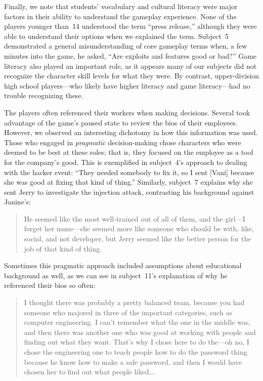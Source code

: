 \documentclass[letterpaper]{article}
\begin{document}
Finally, we note that students' vocabulary and cultural literacy
were major factors in their ability to understand the gameplay
experience.
None of the players younger than~14 understood the term ``press release,''
although they were able to understand their options when we explained
the term.
Subject~5 demonstrated a general misunderstanding of core
gameplay terms when, a few minutes into the game, he asked,
``Are exploits and features good or bad?''
Game literacy also played an important role, as it appears many of
our subjects did not recognize the character skill levels for what they were.
By contrast, upper-division high school players---who likely have
higher literacy and game literacy---had no trouble recognizing these.



The players often referenced their workers when making decisions. Several
took advantage of the game's paused state to review the bios of their
employees. However, we observed an interesting
dichotomy in how this information was used.
Those who engaged in \textit{pragmatic} decision-making chose
characters who were deemed to be best at these roles; that is, they
focused on the employee as a tool for the company's good.
 This is exemplified
in subject~4's approach to dealing with the hacker event:
``They needed somebody to fix it, so
I sent [Vani] because she was good at fixing that kind
of thing.'' Similarly, subject~7 explains why she sent Jerry to investigate
the injection attack, contrasting his background against Janine's:
\begin{quote}
He seemed like the most well-trained out of all of them,
and the girl---I forget her name---she seemed more like someone
who should be with, like, social, and not developer,
but Jerry seemed like the better person for the job of that kind of thing.
\end{quote}
Sometimes this pragmatic approach included assumptions about 
educational background as well, as we can see in subject~11's 
explanation of why he referenced their bios so often:
\begin{quote}
I thought there was probably a pretty balanced team, because you had
someone who majored in three of the important categories,
such as computer engineering.
I can't remember what the one in the middle was, and
then there was another one who was good at working with people and
finding out what they want. That's why I chose here to do the---oh no,
I chose the engineering one to teach people how to do the password thing because
he know how to make a safe password, and then I would have chosen her to
find out what people liked\ldots{}.
\end{quote}
\end{document}
